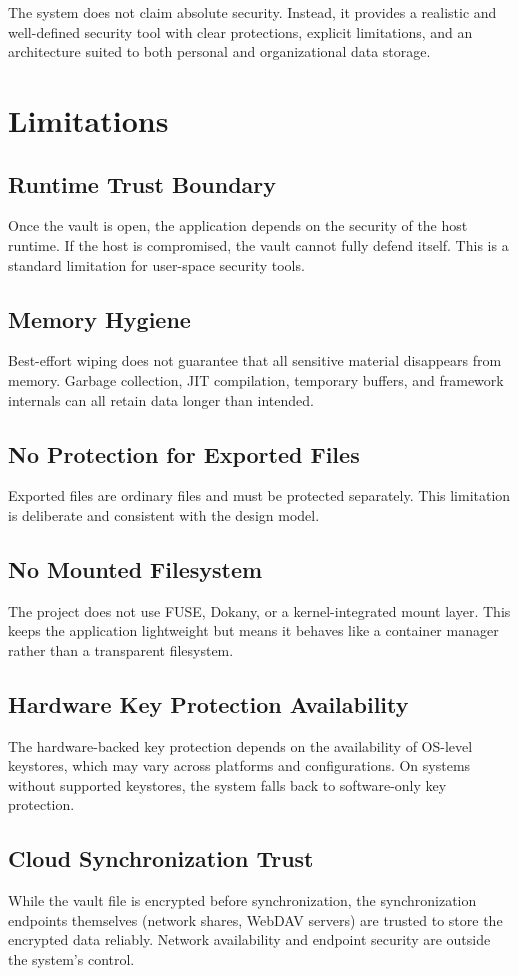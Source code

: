 The system does not claim absolute security. Instead, it provides a realistic and well-defined security tool with clear protections, explicit limitations, and an architecture suited to both personal and organizational data storage.

\section{Limitations}

\subsection{Runtime Trust Boundary}
Once the vault is open, the application depends on the security of the host runtime. If the host is compromised, the vault cannot fully defend itself. This is a standard limitation for user-space security tools.

\subsection{Memory Hygiene}
Best-effort wiping does not guarantee that all sensitive material disappears from memory. Garbage collection, JIT compilation, temporary buffers, and framework internals can all retain data longer than intended.

\subsection{No Protection for Exported Files}
Exported files are ordinary files and must be protected separately. This limitation is deliberate and consistent with the design model.

\subsection{No Mounted Filesystem}
The project does not use FUSE, Dokany, or a kernel-integrated mount layer. This keeps the application lightweight but means it behaves like a container manager rather than a transparent filesystem.

\subsection{Hardware Key Protection Availability}
The hardware-backed key protection depends on the availability of OS-level keystores, which may vary across platforms and configurations. On systems without supported keystores, the system falls back to software-only key protection.

\subsection{Cloud Synchronization Trust}
While the vault file is encrypted before synchronization, the synchronization endpoints themselves (network shares, WebDAV servers) are trusted to store the encrypted data reliably. Network availability and endpoint security are outside the system's control.
